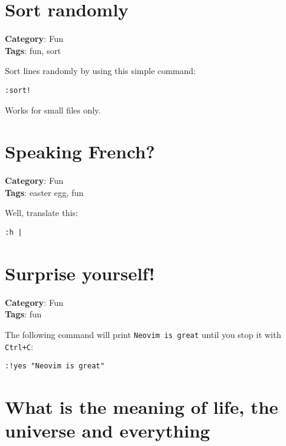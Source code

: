 {{{{{\section{Sort randomly}

\textbf{Category}: Fun\\ \textbf{Tags}: fun, sort
\vspace{0.5cm}

Sort lines randomly by using this simple command:

\begin{Exa*}{}
\begin{Verbatim}[fontsize=\footnotesize, breaklines, breakanywhere]
:sort!
\end{Verbatim}
\end{Exa*}

Works for small files only.

\section{Speaking French?}

\textbf{Category}: Fun\\ \textbf{Tags}: easter egg, fun
\vspace{0.5cm}

Well, translate this:

\begin{Exa*}{}
\begin{Verbatim}[fontsize=\footnotesize, breaklines, breakanywhere]
:h |
\end{Verbatim}
\end{Exa*}

\section{Surprise yourself!}

\textbf{Category}: Fun\\ \textbf{Tags}: fun
\vspace{0.5cm}

The following command will print {\footnotesize \Verb§Neovim is great§} until you stop it with {\footnotesize \Verb§Ctrl+C§}:

\begin{Exa*}{}
\begin{Verbatim}[fontsize=\footnotesize, breaklines, breakanywhere]
:!yes "Neovim is great"
\end{Verbatim}
\end{Exa*}

\section{What is the meaning of life, the universe and everything}

}}}}}
